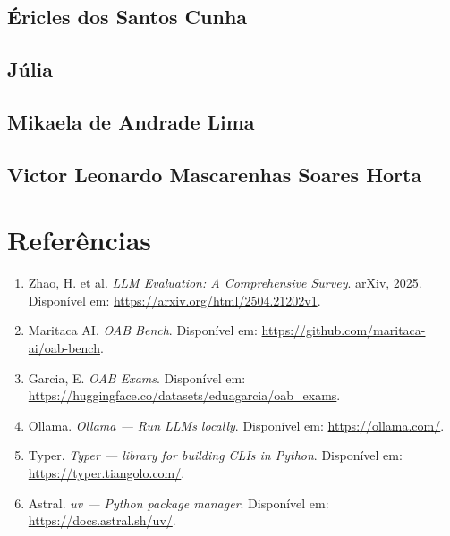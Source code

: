 \documentclass[12pt,a4paper]{article}
\begin{document}
\subsection{Éricles dos Santos Cunha}


\subsection{Júlia}


\subsection{Mikaela de Andrade Lima}


\subsection{Victor Leonardo Mascarenhas Soares Horta}


\section{Referências}

\begin{enumerate}[nosep]
  \item Zhao, H. et al. \textit{LLM Evaluation: A Comprehensive Survey}. arXiv, 2025. Disponível em: \url{https://arxiv.org/html/2504.21202v1}.
  \item Maritaca AI. \textit{OAB Bench}. Disponível em: \url{https://github.com/maritaca-ai/oab-bench}.
  \item Garcia, E. \textit{OAB Exams}. Disponível em: \url{https://huggingface.co/datasets/eduagarcia/oab_exams}.
  \item Ollama. \textit{Ollama — Run LLMs locally}. Disponível em: \url{https://ollama.com/}.
  \item Typer. \textit{Typer — library for building CLIs in Python}. Disponível em: \url{https://typer.tiangolo.com/}.
  \item Astral. \textit{uv — Python package manager}. Disponível em: \url{https://docs.astral.sh/uv/}.
\end{enumerate}
\end{document}
